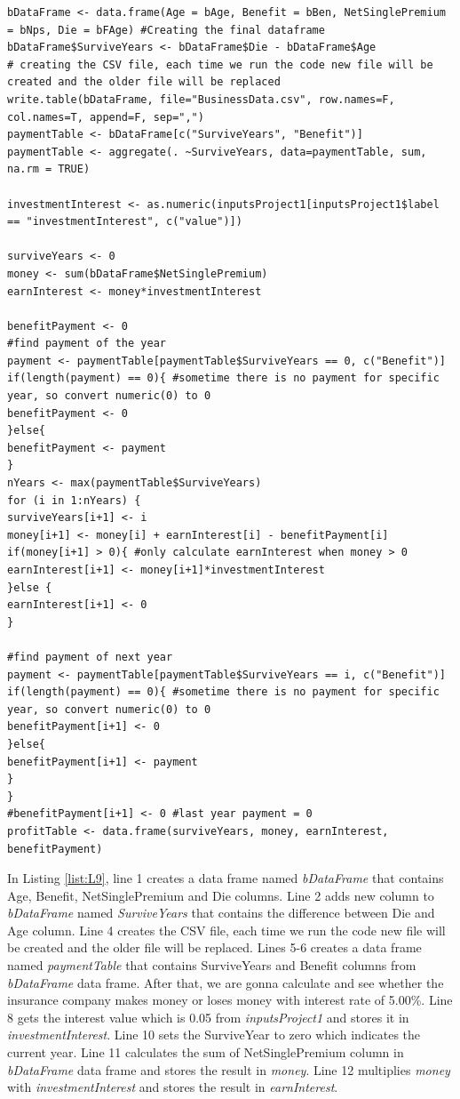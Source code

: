 \documentclass[12pt]{article}
\def\StartLineAtOne{\lstset{firstnumber=1}}
\begin{document}
\StartLineAtOne
\begin{lstlisting}[caption={ Business Data Frame},captionpos=b,label={list:L9}]
bDataFrame <- data.frame(Age = bAge, Benefit = bBen, NetSinglePremium = bNps, Die = bFAge) #Creating the final dataframe
bDataFrame$SurviveYears <- bDataFrame$Die - bDataFrame$Age
# creating the CSV file, each time we run the code new file will be created and the older file will be replaced 
write.table(bDataFrame, file="BusinessData.csv", row.names=F, col.names=T, append=F, sep=",")
paymentTable <- bDataFrame[c("SurviveYears", "Benefit")]
paymentTable <- aggregate(. ~SurviveYears, data=paymentTable, sum, na.rm = TRUE)

investmentInterest <- as.numeric(inputsProject1[inputsProject1$label == "investmentInterest", c("value")])

surviveYears <- 0
money <- sum(bDataFrame$NetSinglePremium)
earnInterest <- money*investmentInterest

benefitPayment <- 0
#find payment of the year
payment <- paymentTable[paymentTable$SurviveYears == 0, c("Benefit")] 
if(length(payment) == 0){ #sometime there is no payment for specific year, so convert numeric(0) to 0
benefitPayment <- 0
}else{
benefitPayment <- payment
} 
nYears <- max(paymentTable$SurviveYears)
for (i in 1:nYears) {
surviveYears[i+1] <- i
money[i+1] <- money[i] + earnInterest[i] - benefitPayment[i]
if(money[i+1] > 0){ #only calculate earnInterest when money > 0
earnInterest[i+1] <- money[i+1]*investmentInterest
}else {
earnInterest[i+1] <- 0
}

#find payment of next year
payment <- paymentTable[paymentTable$SurviveYears == i, c("Benefit")] 
if(length(payment) == 0){ #sometime there is no payment for specific year, so convert numeric(0) to 0
benefitPayment[i+1] <- 0
}else{
benefitPayment[i+1] <- payment
}
}
#benefitPayment[i+1] <- 0 #last year payment = 0
profitTable <- data.frame(surviveYears, money, earnInterest, benefitPayment)
\end{lstlisting}
In Listing \ref{list:L9}, line 1 creates a data frame named \textit{bDataFrame} that contains Age, Benefit, NetSinglePremium and Die columns. Line 2 adds new column to \textit{bDataFrame}  named  \textit{SurviveYears} that contains the difference between Die and Age column. Line 4 creates the CSV file, each time we run the code new file will be created and the older file will be replaced. Lines 5-6 creates a data frame named \textit{paymentTable} that contains SurviveYears and Benefit columns from \textit{bDataFrame} data frame. After that, we are gonna calculate and see whether the insurance company makes money or loses money with interest rate of 5.00\%. Line 8 gets the interest value which is 0.05 from \textit{inputsProject1} and stores it in \textit{investmentInterest}. Line 10 sets the SurviveYear to zero which indicates the current year. Line 11 calculates the sum of NetSinglePremium column in \textit{bDataFrame} data frame and stores the result in \textit{money}. Line 12 multiplies \textit{money} with \textit{investmentInterest} and stores the result in \textit{earnInterest}.
\end{document}
